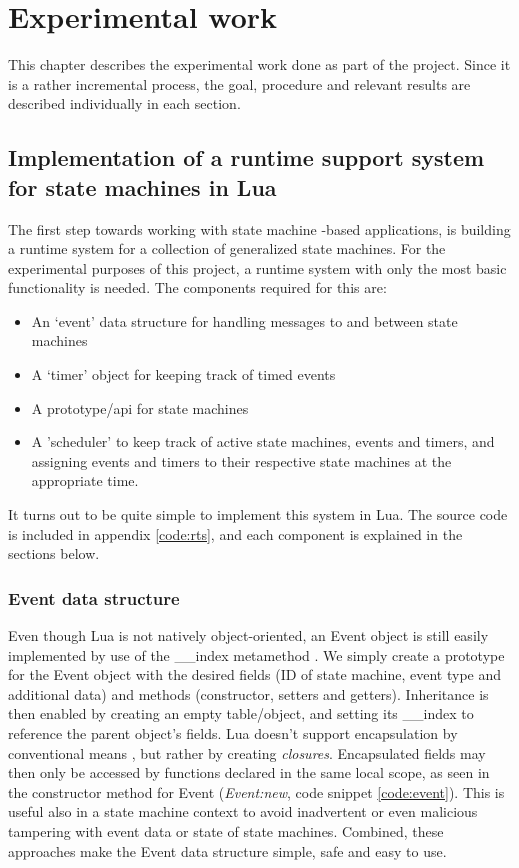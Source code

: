 \chapter{Experimental work}
\label{ch:experimental_work}
This chapter describes the experimental work done as part of the project. Since it is a rather incremental process, the goal, procedure and relevant results are described individually in each section.

\section{Implementation of a runtime support system for state machines in Lua}
\label{sec:impl_runtime_support}
The first step towards working with state machine -based applications, is building a runtime system for a collection of generalized state machines. For the experimental purposes of this project, a runtime system with only the most basic functionality is needed. The components required for this are:

\begin{itemize}
	\item An ‘event’ data structure for handling messages to and between state machines
	\item A ‘timer’ object for keeping track of timed events
	\item A prototype/\gls{api} for state machines
	\item A 'scheduler' to keep track of active state machines, events and timers, and assigning events and timers to their respective state machines at the appropriate time.
\end{itemize}

It turns out to be quite simple to implement this system in Lua. The source code is included in appendix \ref{code:rts}, and each component is explained in the sections below.

\subsection{Event data structure}
\label{sec:impl_event}
Even though Lua is not natively object-oriented, an Event object is still easily implemented by use of the \_\_index metamethod \cite[13.4.1]{book:programming_in_lua_first}. We simply create a prototype for the Event object with the desired fields (ID of state machine, event type and additional data) and methods (constructor, setters and getters). Inheritance is then enabled by creating an empty table/object, and setting its \_\_index to reference the parent object's fields. Lua doesn't support encapsulation by conventional means \cite[16.4]{book:programming_in_lua_first}, but rather by creating \textit{closures}. Encapsulated fields may then only be accessed by functions declared in the same local scope, as seen in the constructor method for Event (\textit{Event:new}, code snippet \ref{code:event}). This is useful also in a state machine context to avoid inadvertent or even malicious tampering with event data or state of state machines. Combined, these approaches make the Event data structure simple, safe and easy to use.

